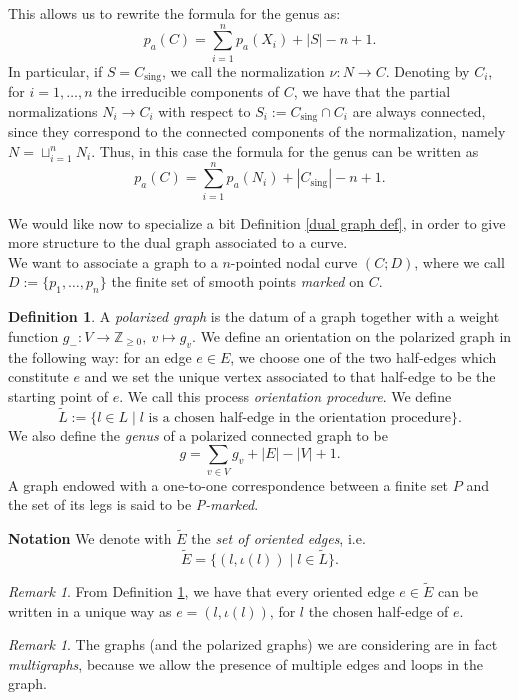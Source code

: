 \documentclass[a4paper,12 pt,titlepage,twoside]{book}
\newcommand{\numberset}{\mathbb}
\newcommand{\Z}{\numberset{Z}}
\theoremstyle{plain}
\theoremstyle{theorem}
\theoremstyle{definition}
\newtheorem{defn}[thm]{Definition}
\theoremstyle{remark}
\newtheorem{oss}[thm]{Remark}
\begin{document}
	This allows us to rewrite the formula for the genus as: $$p_a(C) = \sum_{i=1}^n p_a(X_i) + |S| -n +1.$$
	In particular, if $S = C_\text{sing}$, we call the normalization $\nu \colon N \rightarrow C$. Denoting by $C_i$, for $i = 1, \dots, n$ the irreducible components of $C$, we have that the partial normalizations $N_i \rightarrow C_i$ with respect to $S_i := C_\text{sing} \cap C_i$ are always connected, since they correspond to the connected components of the normalization, namely $N = \sqcup_{i= 1}^n N_i$. Thus, in this case the formula for the genus can be written as \begin{equation} \label{g(C)}
	p_a(C) = \sum_{i=1}^n p_a(N_i) + |C_\text{sing}| - n +1.
	\end{equation}
	
	We would like now to specialize a bit Definition \ref{dual graph def}, in order to give more structure to the dual graph associated to a curve.\\
	We want to associate a graph to a $n$-pointed nodal curve $(C;D)$, where we call $D:=\{p_1, \dots, p_n\}$ the finite set of smooth points \emph{marked} on $C$.
	\begin{defn}\label{orientation}
		A \emph{polarized graph} is the datum of a graph together with a weight function $g_- \colon V \rightarrow \Z_{\ge 0}, \ v \mapsto g_v.$ We define an orientation on the polarized graph in the following way: for an edge $e \in E$, we choose one of the two half-edges which constitute $e$ and we set the unique vertex associated to that half-edge to be the starting point of $e$. We call this process \emph{orientation procedure}. We define $$\tilde{L} := \{l \in L \mid l \text{ is a chosen half-edge in the orientation procedure}\}.$$We also define the \emph{genus} of a polarized connected graph to be $$g = \sum_{v \in V} g_v + |E| - |V| +1.$$ A graph endowed with a one-to-one correspondence between a finite set $P$ and the set of its legs is said to be \emph{P-marked}.
	\end{defn}
	\noindent\textbf{Notation} We denote with $\tilde{E}$ the \emph{set of oriented edges}, i.e. $$\tilde{E} = \{(l, \iota(l)) \mid l \in \tilde{L}\}.$$
	\begin{oss}
		From Definition \ref{orientation}, we have that every oriented edge $e \in \tilde{E}$ can be written in a unique way as $e = (l, \iota(l))$, for $l$ the chosen half-edge of $e$.
	\end{oss}
	\begin{oss}
		The graphs (and the polarized graphs) we are considering are in fact \emph{multigraphs}, because we allow the presence of multiple edges and loops in the graph.
	\end{oss}
\end{document}
